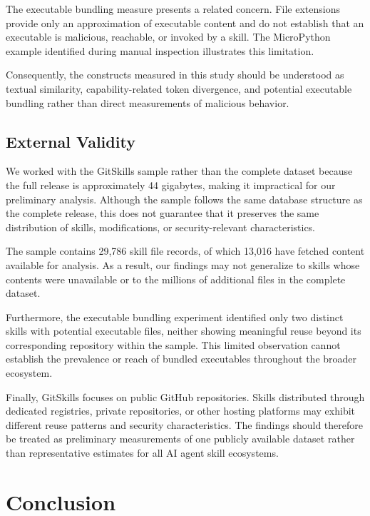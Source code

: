 \documentclass[sigconf,review]{acmart}
\begin{document}
The executable bundling measure presents a related concern. File extensions provide only an approximation of executable content and do not establish that an executable is malicious, reachable, or invoked by a skill. The MicroPython example identified during manual inspection illustrates this limitation.

Consequently, the constructs measured in this study should be understood as textual similarity, capability-related token divergence, and potential executable bundling rather than direct measurements of malicious behavior.

\subsection{External Validity}

We worked with the GitSkills sample rather than the complete dataset because the full release is approximately 44 gigabytes, making it impractical for our preliminary analysis. Although the sample follows the same database structure as the complete release, this does not guarantee that it preserves the same distribution of skills, modifications, or security-relevant characteristics.

The sample contains 29,786 skill file records, of which 13,016 have fetched content available for analysis. As a result, our findings may not generalize to skills whose contents were unavailable or to the millions of additional files in the complete dataset.

Furthermore, the executable bundling experiment identified only two distinct skills with potential executable files, neither showing meaningful reuse beyond its corresponding repository within the sample. This limited observation cannot establish the prevalence or reach of bundled executables throughout the broader ecosystem.

Finally, GitSkills focuses on public GitHub repositories. Skills distributed through dedicated registries, private repositories, or other hosting platforms may exhibit different reuse patterns and security characteristics. The findings should therefore be treated as preliminary measurements of one publicly available dataset rather than representative estimates for all AI agent skill ecosystems.

\section{Conclusion}
\label{Section:Conclusion}
\end{document}
